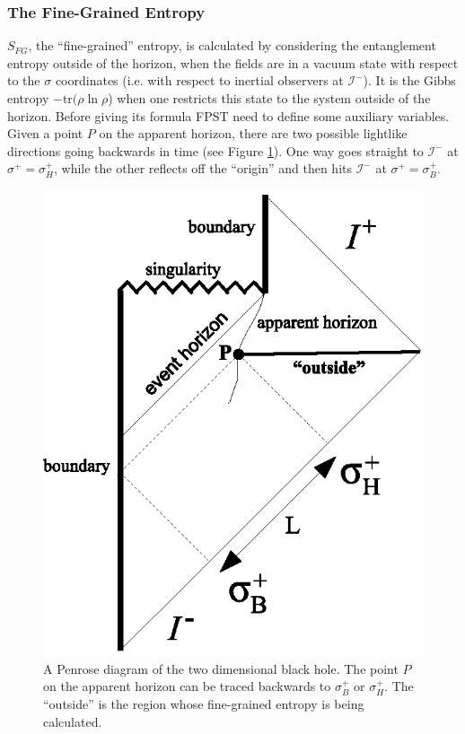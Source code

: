 \documentclass{article}
\begin{document}
\subsubsection{The Fine-Grained Entropy}

$S_{FG}$, the ``fine-grained'' entropy, is calculated by considering the entanglement entropy outside of the horizon, when the fields are in a vacuum state with respect to the $\sigma$ coordinates (i.e. with respect to inertial observers at $\mathcal{I}^{-}$).  It is the Gibbs entropy $-\mathrm{tr}(\rho\ln \rho$) when one restricts this state to the system outside of the horizon.  Before giving its formula FPST need to define some auxiliary variables.  Given a point $P$ on the apparent horizon, there are two possible lightlike directions going backwards in time (see Figure \ref{2Dfig}).  One way goes straight to $\mathcal{I}^{-}$ at $\sigma^{+} = \sigma^{+}_H$, while the other reflects off the ``origin'' and then hits $\mathcal{I}^{-}$ at $\sigma^{+} = \sigma^{+}_B$.
\begin{figure}[ht]
\centering
\includegraphics{2d.eps}
\caption{A Penrose diagram of the two dimensional black hole.  The point $P$ on the apparent horizon can be traced backwards to $\sigma^{+}_B$ or $\sigma^{+}_H$.  The ``outside'' is the region whose fine-grained entropy is being calculated.}\label{2Dfig}
\end{figure}
\end{document}
